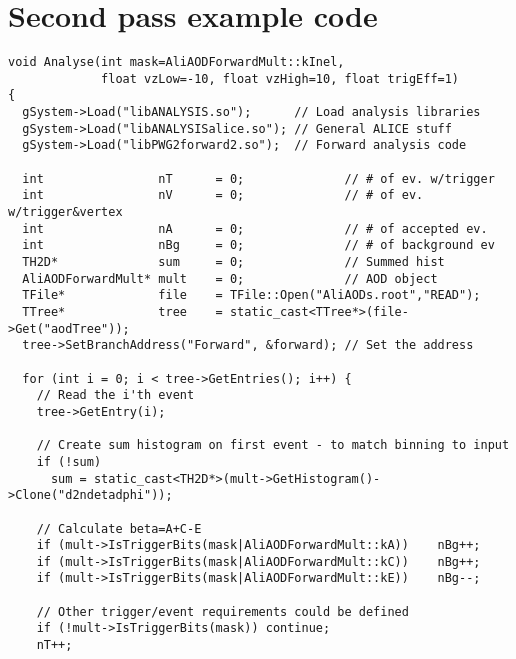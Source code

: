 \documentclass[11pt]{article}
\newcommand{\mult}[1][]{\ensuremath N_{\text{ch}#1}}
\newcommand{\dndeta}[1][]{{\ensuremath%
    \ifx|#1|\else\left.\fi%
    \frac{1}{N}\frac{d\mult{}}{d\eta}%
    \ifx|#1|\else\right|_{#1}\fi%
}}
\begin{document}
\section{Second pass example code}
\label{app:exa_pass2}
\begin{lstlisting}[caption={Example 2\textsuperscript{nd} pass code to
    do $\dndeta$},label={lst:example},frame=single,captionpos=b]
void Analyse(int mask=AliAODForwardMult::kInel,
             float vzLow=-10, float vzHigh=10, float trigEff=1)
{ 
  gSystem->Load("libANALYSIS.so");      // Load analysis libraries
  gSystem->Load("libANALYSISalice.so"); // General ALICE stuff
  gSystem->Load("libPWG2forward2.so");  // Forward analysis code

  int                nT      = 0;              // # of ev. w/trigger
  int                nV      = 0;              // # of ev. w/trigger&vertex
  int                nA      = 0;              // # of accepted ev.
  int                nBg     = 0;              // # of background ev
  TH2D*              sum     = 0;              // Summed hist
  AliAODForwardMult* mult    = 0;              // AOD object
  TFile*             file    = TFile::Open("AliAODs.root","READ");
  TTree*             tree    = static_cast<TTree*>(file->Get("aodTree"));
  tree->SetBranchAddress("Forward", &forward); // Set the address

  for (int i = 0; i < tree->GetEntries(); i++) { 
    // Read the i'th event 
    tree->GetEntry(i);

    // Create sum histogram on first event - to match binning to input
    if (!sum) 
      sum = static_cast<TH2D*>(mult->GetHistogram()->Clone("d2ndetadphi"));
    
    // Calculate beta=A+C-E
    if (mult->IsTriggerBits(mask|AliAODForwardMult::kA))    nBg++;
    if (mult->IsTriggerBits(mask|AliAODForwardMult::kC))    nBg++;
    if (mult->IsTriggerBits(mask|AliAODForwardMult::kE))    nBg--;

    // Other trigger/event requirements could be defined 
    if (!mult->IsTriggerBits(mask)) continue; 
    nT++;


\end{lstlisting}
\end{document}
